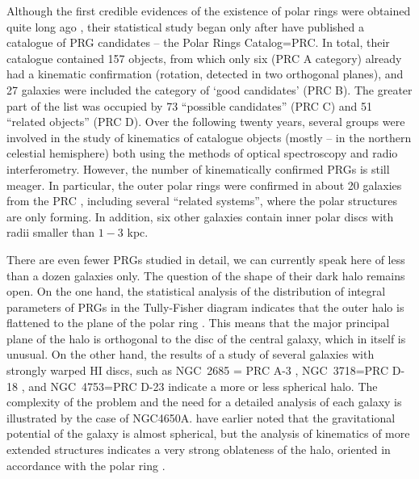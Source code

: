 \documentclass[useAMS,usenatbib]{mn2e}
\begin{document}
Although the first credible evidences of the existence of polar
rings were obtained quite long ago \citep{SchechterGunn1978},
their statistical study began only after \citet{Whitmore1990} have
published a catalogue of PRG candidates -- the Polar Rings
Catalog=PRC. In total, their catalogue contained 157 objects, from
which only six (PRC A category) already had a kinematic confirmation
(rotation, detected in two orthogonal planes), and 27 galaxies were
included the category of `good candidates' (PRC B). The greater
part of the list was occupied by 73 ``possible candidates'' (PRC
C) and 51 ``related objects'' (PRC D). Over the following twenty
years, several groups were involved in the study of kinematics of
catalogue objects (mostly -- in the northern celestial hemisphere)
both using the methods of optical spectroscopy and radio
interferometry. However, the number of kinematically confirmed
PRGs is still meager. In particular, the outer polar rings were
confirmed in about 20 galaxies from the PRC \citep*[]{Resh2011},
including several ``related systems'', where the polar structures
are only forming. In addition, six other galaxies contain inner
polar discs with radii smaller than $1-3$ kpc.



There are even fewer PRGs studied in detail, we can currently
speak here of less than a dozen galaxies only. The question of the
shape of their dark halo remains open. On the one hand, the
statistical analysis of the distribution of integral parameters of
PRGs in the Tully-Fisher diagram indicates that the outer halo is flattened to the plane of the
polar ring \citep{Iodice03,Resh2004}.
This means that the major principal plane of the halo is
orthogonal to the disc of the central galaxy, which in itself is
unusual. On the other hand, the results of a study of several
galaxies with strongly warped HI discs, such as NGC~2685 = PRC A-3
\citep{Jozsa2009}, NGC~3718=PRC D-18 \citep{Sparke2009}, and
NGC~4753=PRC D-23\citep*{Steiman1992} indicate a more or less
spherical halo.  The complexity of the problem and the need for a
detailed analysis of each galaxy is illustrated by the case of NGC4650A.
\citet*{Whitmore1987} have earlier noted that the
gravitational potential of the galaxy is almost spherical, but the
analysis of  kinematics of more extended structures indicates a
very strong oblateness of the halo, oriented in accordance with
the polar ring \citep{Iodice2010}.
\end{document}
